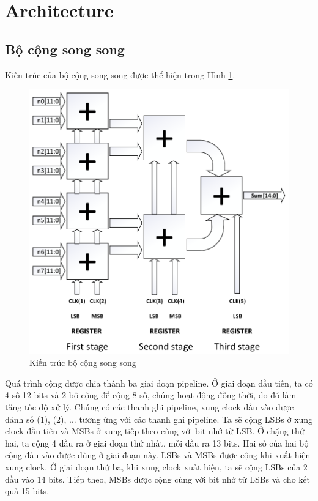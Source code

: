 \documentclass[conference]{IEEEtran}
\begin{document}
	\section{Architecture}
	\subsection{Bộ cộng song song}
	Kiến trúc của bộ cộng song song được thể hiện trong Hình \ref{adder}.\\
	\begin{figure}[h]
		\includegraphics[width=\linewidth]{Figures/adder.pdf}
		\caption{Kiến trúc bộ cộng song song} 
		\label{adder}
	\end{figure}
	Quá trình cộng được chia thành ba giai đoạn pipeline. Ở giai đoạn đầu tiên, ta có 4 số 12 bits và 2 bộ cộng để cộng 8 số, chúng hoạt động đồng thời, do đó làm tăng tốc độ xử lý. Chúng có các thanh ghi pipeline, xung clock đầu vào được đánh số (1), (2), ... tương ứng với các thanh ghi pipeline. Ta sẽ cộng LSBs ở xung clock đầu tiên và MSBs ở xung tiếp theo cùng với bit nhớ từ LSB. Ở chặng thứ hai, ta cộng 4 đầu ra ở giai đoạn thứ nhất, mỗi đầu ra 13 bits. Hai số của hai bộ cộng đàu vào được dùng ở giai đoạn này. LSBs và MSBs được cộng khi xuất hiện xung clock. Ở giai đoạn thứ ba, khi xung clock xuất hiện, ta sẽ cộng LSBs của 2 đầu vào 14 bits. Tiếp theo, MSBs được cộng cùng với bit nhớ từ LSBs và cho kết quả 15 bits.
\end{document}
